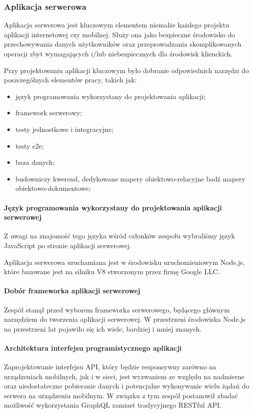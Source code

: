 \documentclass[12pt, a4paper, twoside, openany]{book}
\newcommand{\forceindent}{\leavevmode{\parindent=1.3em\indent}}
\begin{document}
\subsubsection{Aplikacja serwerowa}

\forceindent Aplikacja serwerowa jest kluczowym elementem niemalże każdego projektu aplikacji
internetowej czy mobilnej. Służy ona jako bezpieczne środowisko do przechowywania danych
użytkowników oraz przeprowadzania skomplikowanych operacji zbyt wymagających i/lub
niebezpiecznych dla środowisk klienckich.

Przy projektowaniu aplikacji kluczowym było dobranie odpowiednich narzędzi do
poszczególnych elementów pracy, takich jak:
\begin{itemize}
    \item język programowania wykorzystany do projektowania aplikacji;
    \item framework serwerowy;
    \item testy jednostkowe i integracyjne;
    \item testy e2e;
    \item baza danych;
    \item budowniczy kwerend, dedykowane mapery obiektowo-relacyjne badź mapery obiektowo-dokumentowe;
\end{itemize}

\paragraph{Język programowania wykorzystany do projektowania aplikacji serwerowej\\}

\forceindent Z uwagi na znajomość tego języka wśród członków zespołu wybraliśmy język JavaScript
po stronie aplikacji serwerowej.

Aplikacja serwerowa uruchamiana jest w środowisku uruchomieniowym Node.js, które bazowane jest na
silniku V8 stworzonym przez firmę Google LLC.

\paragraph{Dobór frameworka aplikacji serwerowej\\}
\forceindent Zespół stanął przed wyborem frameworka serwerowego, będącego głównym narzędziem do tworzenia aplikacji serwerowej.
W przestrzeni środowiska Node.js na przestrzeni lat pojawiło się ich wiele, bardziej i
mniej znanych.

\paragraph{Architektura interfejsu programistycznego aplikacji\\}
\forceindent Zaprojektowanie interfejsu API, który będzie responsywny zarówno na urządzeniach mobilnych, jak i w sieci, jest wyzwaniem ze względu na nadmierne oraz niedostateczne pobieranie danych i potencjalne wykonywanie wielu żądań do serwera na urządzeniu mobilnym.
W związku z tym zespół postanowił zbadać możliwość wykorzystania GraphQL zamiast tradycyjnego RESTful API.
\end{document}
